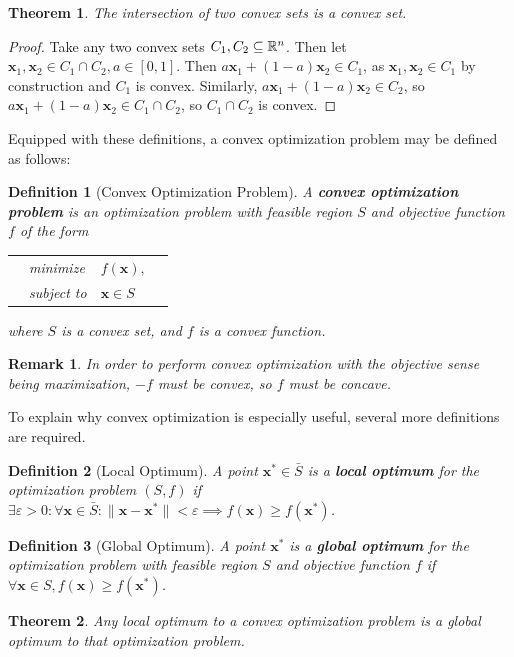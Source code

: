 \documentclass[10pt]{article}
\renewcommand{\vec}[1]{\mathbf{#1}}
\newcommand{\R}[1][]{ \ifx&#1& \mathbb{R} \else \mathbb{R}^{#1} \fi }
\newcommand{\affcomb}[3][a]{#1#2 + (1-#1)#3}
\newcommand{\x}{\vec{x}}
\newtheorem*{definition}{Definition}
\newtheorem{theorem}{Theorem}[section]
\newtheorem*{remark}{Remark}
\begin{document}
\begin{theorem}
	The intersection of two convex sets is a convex set.
\end{theorem} 
\begin{proof}
	Take any two convex sets $C_1, C_2\subseteq\R[n]$. Then let $\vec{x}_1, \vec{x}_2\in C_1\cap C_2, a\in[0,1]$.  Then $\affcomb{\vec{x}_1}{\vec{x}_2}\in C_1$, as $\vec{x}_1, \vec{x}_2\in C_1$ by construction and $C_1$ is convex. Similarly, $\affcomb{\vec{x}_1}{\vec{x}_2}\in C_2$, so $\affcomb{\vec{x}_1}{\vec{x}_2}\in C_1\cap C_2$, so $C_1\cap C_2$ is convex.
\end{proof}

Equipped with these definitions, a convex optimization problem may be defined as follows:
\begin{definition}[Convex Optimization Problem]
	A \textbf{convex optimization problem} is an optimization problem with feasible region $S$ and objective function $f$ of the form \\
	\begin{tabularx}{\textwidth}{X l l X}
		& minimize & $f(\x),$ & \\
		& subject to & $\x\in S$ &
	\end{tabularx}
	where $S$ is a convex set, and $f$ is a convex function.
\end{definition}
\begin{remark}
	In order to perform convex optimization with the objective sense being maximization, $-f$ must be convex, so $f$ must be concave.
\end{remark}
To explain why convex optimization is especially useful, several more definitions are required.
\begin{definition}[Local Optimum]
	A point $\x^*\in\bar{S}$ is a \textbf{local optimum} for the optimization problem $(S,f)$ if $\exists\varepsilon>0:\forall \x\in \bar{S}:\lVert \x-\x^*\rVert < \varepsilon\implies f(\x)\geq f(\x^*)$.
\end{definition}
\begin{definition}[Global Optimum]
	A point $\x^*$ is a \textbf{global optimum} for the optimization problem with feasible region $S$ and objective function $f$ if $\forall \x\in S, f(\x)\geq f(\x^*)$.
\end{definition}
\begin{theorem}
	Any local optimum to a convex optimization problem is a global optimum to that optimization problem.
\end{theorem}
\end{document}
